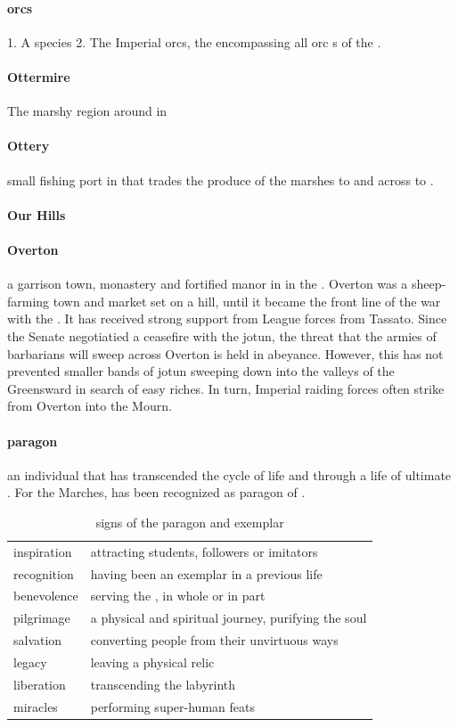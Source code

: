 \paragraph{orcs} 1. A species 2. The Imperial orcs, the  encompassing all orc s of the .
\paragraph{Ottermire} The marshy region around  in 
\paragraph{Ottery} small fishing port in  that trades the produce of the marshes to  and across  to .
\paragraph{Our Hills} 
\paragraph{Overton} a garrison town, monastery and fortified manor in  in the . Overton was a sheep-farming town and market set on a hill, until it became the front line of the war with the . It has received strong support from League forces from Tassato. Since the Senate negotiatied a ceasefire with the jotun, the threat that the armies of barbarians will sweep across Overton is held in abeyance. However, this has not prevented smaller bands of jotun sweeping down into the valleys of the Greensward in search of easy riches. In turn, Imperial raiding forces often strike from Overton into the Mourn.
\paragraph{paragon} an individual that has transcended the cycle of life and  through a life of ultimate . For the Marches,  has been recognized as paragon of . \begin{table} \centering \begin{tabular}{ll} inspiration & attracting students, followers or imitators \\ recognition & having been an exemplar in a previous life \\ benevolence & serving the \s{Empire}, in whole or in part \\ pilgrimage & a physical and spiritual journey, purifying the soul \\ salvation & converting people from their unvirtuous ways \\ legacy & leaving a physical relic \\\hline liberation & transcending the labyrinth \\ miracles & performing super-human feats \end{tabular}\caption{signs of the paragon and exemplar}\end{table}

